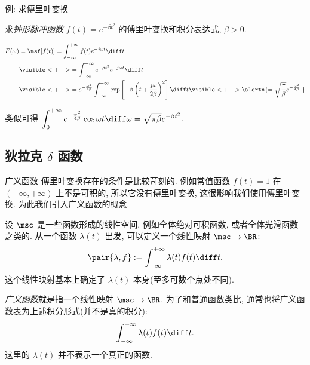 \begin{frame}{例: 求傅里叶变换}
	\onslide<+->
	\begin{example}
		求\emph{钟形脉冲函数} $f(t)=e^{-\beta t^2}$ 的傅里叶变换和积分表达式, $\beta>0$.
	\end{example}

	\onslide<+->
	\begin{solution}
		\vspace{-\baselineskip}
		\begin{align*}
			F(\omega)&=\msf[f(t)]=\int_{-\infty}^{+\infty}f(t)e^{-j\omega t}\diff t\\
			&\visible<+->{=\int_{-\infty}^{+\infty}e^{-\beta t^2}e^{-j\omega t}\diff t}\\
			&\visible<+->{=e^{-\frac{\omega^2}{4\beta}}\int_{-\infty}^{+\infty}\exp\left[-\beta\left(t+\frac{j\omega}{2\beta}\right)^2\right]\diff t}
			\visible<+->{\alertn{=\sqrt{\frac\pi\beta}e^{-\frac{\omega^2}{4\beta}}.}}
		\end{align*}
	\end{solution}

	\onslide<+->
	类似可得
	$\displaystyle\int_0^{+\infty}e^{-\frac{\omega^2}{4\beta}}\cos\omega t\diff\omega=\sqrt{\pi\beta}e^{-\beta t^2}$.
\end{frame}


\subsection{狄拉克 \texorpdfstring{$\delta$}{δ} 函数}

\begin{frame}{广义函数}
	\onslide<+->
	傅里叶变换存在的条件是比较苛刻的.
	\onslide<+->
	例如常值函数 $f(t)=1$ 在 $(-\infty,+\infty)$ 上不是可积的, 所以它没有傅里叶变换, 这很影响我们使用傅里叶变换.
	\onslide<+->
	为此我们引入广义函数的概念.

	\onslide<+->
	设 $\msc$ 是一些函数形成的线性空间, 例如全体绝对可积函数, 或者全体光滑函数之类的. 
	\onslide<+->
	从一个函数 $\lambda(t)$ 出发, 可以定义一个线性映射 $\msc\to \BR$:
	\[\pair{\lambda,f}:=\int_{-\infty}^{+\infty}\lambda(t)f(t)\diff t.\]
	\onslide<+->
	这个线性映射基本上确定了 $\lambda(t)$ 本身(至多可数个点处不同).

	\onslide<+->
	\emph{广义函数}就是指一个线性映射 $\msc\to \BR$.
	\onslide<+->
	为了和普通函数类比, 通常也将广义函数表为上述积分形式(并不是真的积分):
	\[\int_{-\infty}^{+\infty}\lambda(t)f(t)\diff t.\]
	这里的 $\lambda(t)$ 并不表示一个真正的函数.
\end{frame}


